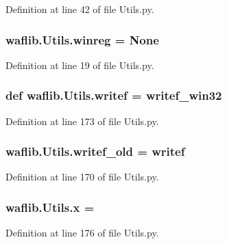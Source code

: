 Definition at line 42 of file Utils.\+py.

\subsubsection[{\texorpdfstring{winreg}{winreg}}]{\setlength{\rightskip}{0pt plus 5cm}waflib.\+Utils.\+winreg = None}\hypertarget{namespacewaflib_1_1_utils_a05bae49c975b395dc557f12597e2d085}{}\label{namespacewaflib_1_1_utils_a05bae49c975b395dc557f12597e2d085}


Definition at line 19 of file Utils.\+py.

\subsubsection[{\texorpdfstring{writef}{writef}}]{\setlength{\rightskip}{0pt plus 5cm}def waflib.\+Utils.\+writef = {\bf writef\+\_\+win32}}\hypertarget{namespacewaflib_1_1_utils_a5bf89e2dacc97e9c0fb551ea3c45fe9f}{}\label{namespacewaflib_1_1_utils_a5bf89e2dacc97e9c0fb551ea3c45fe9f}


Definition at line 173 of file Utils.\+py.

\subsubsection[{\texorpdfstring{writef\+\_\+old}{writef_old}}]{\setlength{\rightskip}{0pt plus 5cm}waflib.\+Utils.\+writef\+\_\+old = {\bf writef}}\hypertarget{namespacewaflib_1_1_utils_abf8ddd2dfd52e164e18730ced726a5bf}{}\label{namespacewaflib_1_1_utils_abf8ddd2dfd52e164e18730ced726a5bf}


Definition at line 170 of file Utils.\+py.

\subsubsection[{\texorpdfstring{x}{x}}]{ waflib.\+Utils.\+x = \textquotesingle{}\textquotesingle{}}\hypertarget{namespacewaflib_1_1_utils_a15fc4f04cecad81fba9772c4e43d40f7}{}\label{namespacewaflib_1_1_utils_a15fc4f04cecad81fba9772c4e43d40f7}


Definition at line 176 of file Utils.\+py.

